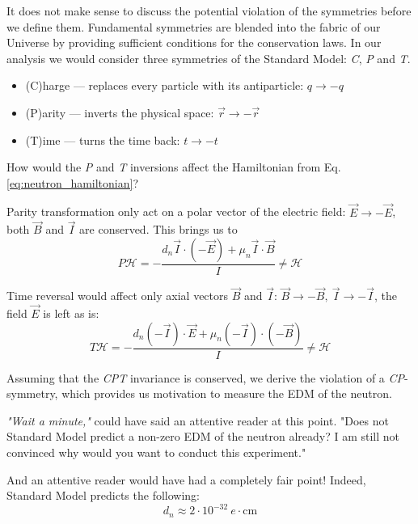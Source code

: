 It does not make sense to discuss the potential violation of the symmetries before we define them.  Fundamental symmetries are blended into the fabric of our Universe by providing sufficient conditions \cite{Noether1918} for the conservation laws. In our analysis we would consider three symmetries of the Standard Model: \textit{C}, \textit{P} and \textit{T}.

\begin{itemize}
	\item (C)harge –-- replaces every particle with its antiparticle: $q \rightarrow -q$
	\item (P)arity --- inverts the physical space: $\vec{r} \rightarrow -\vec{r}$
	\item (T)ime --- turns the time back: $t \rightarrow -t$
\end{itemize}

How would the \textit{P} and \textit{T} inversions affect \cite{Dubbers2011} the Hamiltonian from Eq. \ref{eq:neutron_hamiltonian}?

Parity transformation only act on a polar vector of the electric field: $\vec{E} \rightarrow -\vec{E}$, both $\vec{B}$ and $\vec{I}$ are conserved. This brings us to
\begin{equation}
	\textit{P}\mathcal{H} = -\frac{d_n \vec{I} \cdot \left(-\vec{E}\right) + \mu_n \vec{I} \cdot \vec{B}}{I} \neq \mathcal{H}
	\label{eq:neutron_hamiltonian_P}
\end{equation}

Time reversal would affect only axial vectors $\vec{B}$ and $\vec{I}$: $\vec{B} \rightarrow -\vec{B},\ \vec{I} \rightarrow -\vec{I}$, the field $\vec{E}$ is left as is:
\begin{equation}
	\textit{T}\mathcal{H} = -\frac{d_n \left(-\vec{I}\right) \cdot \vec{E} + \mu_n \left(-\vec{I}\right) \cdot \left( -\vec{B} \right)}{I} \neq \mathcal{H}
	\label{eq:neutron_hamiltonian_T}
\end{equation}

Assuming that the \textit{CPT} invariance \cite{Schwinger1951} is conserved, we derive the violation of a \textit{CP}-symmetry, which provides us motivation to measure the EDM of the neutron.

\textit{"Wait a minute,"} could have said an attentive reader at this point. "Does not Standard Model predict a non-zero EDM of the neutron already? I am still not convinced why would you want to conduct this experiment."

And an attentive reader would have had a completely fair point! Indeed, Standard Model predicts the following:
\begin{equation}
	d_n \approx 2 \cdot 10^{-32}\ e \cdot \text{cm}
\end{equation}


